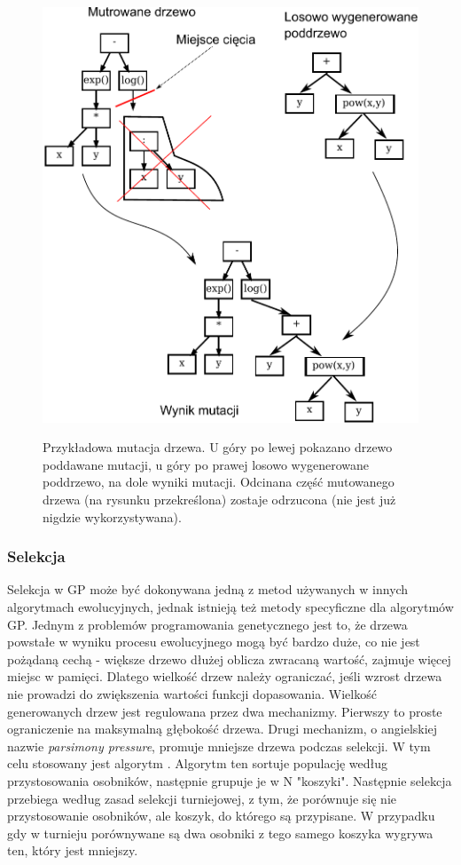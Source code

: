 \begin{figure}[h]
\centering
\includegraphics[scale=0.8]{figures/graphs/2-mutation}
\label{fig:2-mutation}
\caption{Przykładowa mutacja drzewa. U góry po lewej pokazano drzewo poddawane mutacji, u góry po prawej losowo wygenerowane poddrzewo, na dole wyniki mutacji. Odcinana część mutowanego drzewa (na rysunku przekreślona) zostaje odrzucona (nie jest już nigdzie wykorzystywana).} 
\end{figure}

\subsubsection{Selekcja}
Selekcja w GP może być dokonywana jedną z metod używanych w innych algorytmach ewolucyjnych, jednak istnieją też metody specyficzne dla algorytmów GP. Jednym z problemów programowania genetycznego jest to, że drzewa powstałe w wyniku procesu ewolucyjnego mogą być bardzo duże, co nie jest pożądaną cechą - większe drzewo dłużej oblicza zwracaną wartość, zajmuje więcej miejsc w pamięci. Dlatego wielkość drzew należy ograniczać, jeśli wzrost drzewa nie prowadzi do zwiększenia wartości funkcji dopasowania.
Wielkość generowanych drzew jest regulowana przez dwa mechanizmy. Pierwszy to proste ograniczenie na maksymalną głębokość drzewa. Drugi mechanizm, o angielskiej nazwie \textit{parsimony pressure},  promuje mniejsze drzewa podczas selekcji. W tym celu stosowany jest algorytm . Algorytm ten sortuje populację według przystosowania osobników, następnie grupuje je w N "koszyki". Następnie selekcja przebiega według zasad selekcji turniejowej, z tym, że porównuje się nie przystosowanie osobników, ale koszyk, do którego są przypisane. W przypadku gdy w turnieju porównywane są dwa osobniki z tego samego koszyka wygrywa ten, który jest mniejszy.


